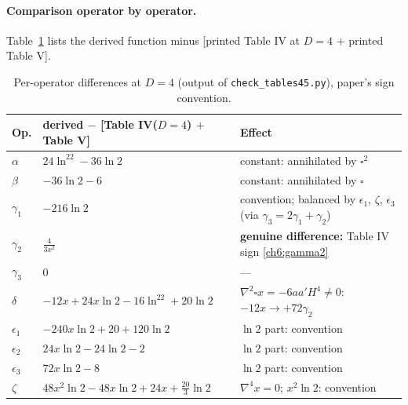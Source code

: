 \paragraph{Comparison operator by operator.} Table~\ref{ch6:tab:Vdiff} lists the derived function minus [printed Table IV at $D=4$ $+$ printed Table V].

\begin{table}[ht]
\centering\small
\renewcommand{\arraystretch}{1.35}
\begin{tabular}{lll}
\toprule
Op. & derived $-$ [Table IV($D=4$) $+$ Table V] & Effect\\
\midrule
$\alpha$ & $24\ln^22-36\ln2$ & constant: annihilated by $\square^2$\\
$\beta$ & $-36\ln2-6$ & constant: annihilated by $\square$\\
$\gamma_1$ & $-216\ln2$ & convention; balanced by $\epsilon_1$, $\zeta$, $\epsilon_3$ (via $\gamma_3=2\gamma_1+\gamma_2$)\\
$\gamma_2$ & $\frac{4}{3x^2}$ & \textbf{genuine difference:} Table IV sign \eqref{ch6:gamma2}\\
$\gamma_3$ & $0$ & ---\\
$\delta$ & $-12x+24x\ln2-16\ln^22+20\ln2$ & $\nabla^2\square x=-6aa'H^4\neq0$: \ $-12x\to+72\gamma_2$\\
$\epsilon_1$ & $-240x\ln2+20+120\ln2$ & $\ln2$ part: convention\\
$\epsilon_2$ & $24x\ln2-24\ln2-2$ & $\ln2$ part: convention\\
$\epsilon_3$ & $72x\ln2-8$ & $\ln2$ part: convention\\
$\zeta$ & $48x^2\ln2-48x\ln2+24x+\frac{20}{3}\ln2$ & $\nabla^4x=0$; $x^2\ln2$: convention\\
\bottomrule
\end{tabular}
\caption{Per-operator differences at $D=4$ (output of \texttt{check\_tables45.py}), paper's sign convention.}
\label{ch6:tab:Vdiff}
\end{table}

